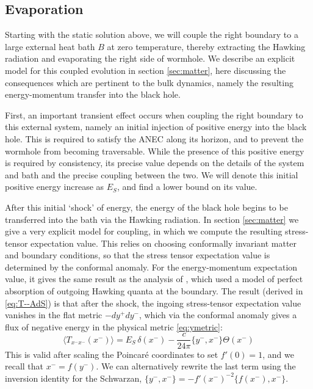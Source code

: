\documentclass[12pt]{article}
\begin{document}
\subsection{Evaporation}\label{ssec:evap}
Starting with the static solution above, we will couple the right boundary to a large external heat bath $B$ at zero temperature, thereby extracting the Hawking radiation and evaporating the right side of wormhole. We describe an explicit model for this coupled evolution in section \ref{sec:matter}, here discussing the consequences which are pertinent to the bulk dynamics, namely the resulting energy-momentum transfer into the black hole.



First, an important transient effect occurs when coupling the right boundary to this external system, namely an initial injection of positive energy into the black hole. This is required to satisfy the ANEC along its horizon, and to prevent the wormhole from becoming traversable.  While the presence of this positive energy is required by consistency, its precise value depends on the details of the system and bath and the precise coupling between the two. We will denote this initial positive energy increase as $E_S$, and find a lower bound on its value.


After this initial `shock' of energy, the energy of the black hole begins to be transferred into the bath via the Hawking radiation. In section \ref{sec:matter} we give a very explicit model for coupling, in which we compute the resulting stress-tensor expectation value. This relies on choosing conformally invariant matter and boundary conditions, so that the stress tensor expectation value is determined by the conformal anomaly. For the energy-momentum expectation value, it gives the same result as the analysis of \cite{Engelsoy:2016xyb}, which used a model of perfect absorption of outgoing Hawking quanta at the boundary. The result (derived in \eqref{eq:T--AdS}) is that after the shock, the ingoing stress-tensor expectation value vanishes in the flat metric $-dy^+ dy^-$, which via the conformal anomaly gives a flux of negative energy in the physical metric \eqref{eq:ymetric}:
\begin{equation}\label{eq:T--}
	 \langle T_{x^-x^-}(x^-)\rangle = E_S\, \delta(x^-)-\frac{c}{24\pi}\{y^-,x^-\}\Theta(x^-)
\end{equation}
This is valid after scaling the Poincar\'e coordinates to set $f'(0)=1$, and we recall that $x^-=f(y^-)$. We can alternatively rewrite the last term using the inversion identity for the Schwarzan, $\{y^-,x^-\} = -f'(x^-)^{-2} \{f(x^-),x^-\}$.
\end{document}
